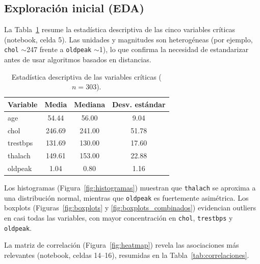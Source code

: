 \documentclass[11pt,a4paper]{article}
\begin{document}
\subsection{Exploración inicial (EDA)}

La Tabla~\ref{tab:descriptiva} resume la estadística descriptiva de las cinco variables
críticas (notebook, celda 5). Las unidades y magnitudes son heterogéneas (por ejemplo,
\texttt{chol} $\sim$247 frente a \texttt{oldpeak} $\sim$1), lo que confirma la necesidad de
estandarizar antes de usar algoritmos basados en distancias.

\begin{table}[H]
  \centering
  \caption{Estadística descriptiva de las variables críticas ($n=303$).}
  \label{tab:descriptiva}
  \begin{tabular}{@{}lccc@{}}
    \toprule
    \textbf{Variable} & \textbf{Media} & \textbf{Mediana} & \textbf{Desv. estándar} \\
    \midrule
    age & 54.44 & 56.00 & 9.04 \\
    chol & 246.69 & 241.00 & 51.78 \\
    trestbps & 131.69 & 130.00 & 17.60 \\
    thalach & 149.61 & 153.00 & 22.88 \\
    oldpeak & 1.04 & 0.80 & 1.16 \\
    \bottomrule
  \end{tabular}
\end{table}

Los histogramas (Figura~\ref{fig:histogramas}) muestran que \texttt{thalach} se aproxima a una
distribución normal, mientras que \texttt{oldpeak} es fuertemente asimétrica. Los boxplots
(Figuras~\ref{fig:boxplots} y \ref{fig:boxplots_combinados}) evidencian outliers en casi todas
las variables, con mayor concentración en \texttt{chol}, \texttt{trestbps} y \texttt{oldpeak}.

La matriz de correlación (Figura~\ref{fig:heatmap}) revela las asociaciones más relevantes
(notebook, celdas 14--16), resumidas en la Tabla~\ref{tab:correlaciones}.
\end{document}
